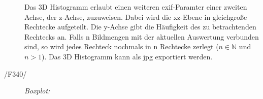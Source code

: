 \begin{description}
			\begin{figure}[H]
				\centering
			\end{figure}
			Das 3D Histogramm erlaubt einen weiteren \gls{exif}-Paramter einer zweiten Achse, der z-Achse, zuzuweisen.
			Dabei wird die xz-Ebene in gleichgroße Rechtecke aufgeteilt. Die y-Achse gibt die Häufigkeit des zu betrachtenden Rechtecks an. Falls n Bildmengen mit der aktuellen Auswertung verbunden sind, so wird jedes Rechteck nochmals in n Rechtecke zerlegt ($ n \in \mathbb{N} $ und $ n>1 $). Das 3D Histogramm kann als \gls{jpg} exportiert werden.

		\item[/F340/] \textit{Boxplot:}\par 
			\begin{figure}[H]
				\centering
			\end{figure}



\end{description}
